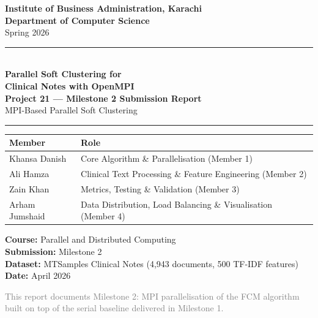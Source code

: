 \documentclass[12pt,a4paper]{article}
\begin{document}
\begin{titlepage}
    \centering
    \vspace*{1.5cm}
    {\Large\bfseries\color{ibaBlue}
        Institute of Business Administration, Karachi\\[0.4em]
        Department of Computer Science}\\[0.3em]
    {\normalsize Spring 2026}

    \vspace{1.5cm}
    \rule{\textwidth}{1.5pt}\\[0.4em]
    {\LARGE\bfseries\color{ibaBlue}
        Parallel Soft Clustering for\\[0.2em]
        Clinical Notes with OpenMPI}\\[0.4em]
    {\large\bfseries Project 21 --- Milestone 2 Submission Report}\\[0.2em]
    {\large MPI-Based Parallel Soft Clustering}
    \rule{\textwidth}{1.5pt}

    \vspace{1.5cm}
    \begin{tabular}{ll}
        \toprule
        \textbf{Member} & \textbf{Role} \\
        \midrule
        Khansa Danish   & Core Algorithm \& Parallelisation (Member 1) \\
        Ali Hamza       & Clinical Text Processing \& Feature Engineering (Member 2) \\
        Zain Khan       & Metrics, Testing \& Validation (Member 3) \\
        Arham Jumshaid  & Data Distribution, Load Balancing \& Visualisation (Member 4) \\
        \bottomrule
    \end{tabular}

    \vspace{1.5cm}
    {\normalsize\textbf{Course:} Parallel and Distributed Computing}\\[0.3em]
    {\normalsize\textbf{Submission:} Milestone 2}\\[0.3em]
    {\normalsize\textbf{Dataset:} MTSamples Clinical Notes (4,943 documents, 500 TF-IDF features)}\\[0.3em]
    {\normalsize\textbf{Date:} April 2026}

    \vfill
    {\small\textcolor{gray}{This report documents Milestone 2: MPI parallelisation of the FCM algorithm\\
    built on top of the serial baseline delivered in Milestone 1.}}
\end{titlepage}
\end{document}
